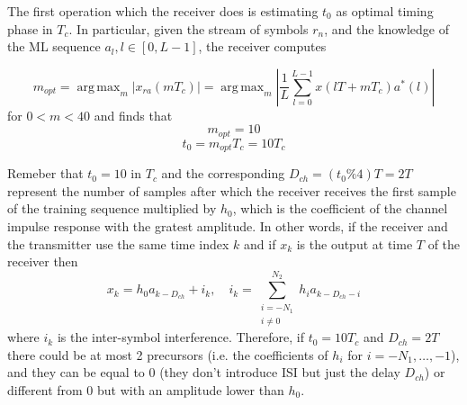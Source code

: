 \documentclass[10pt]{article}
\DeclareMathOperator*{\argmax}{arg\,max}
\begin{document}
The first operation which the receiver does is estimating $t_0$ as optimal timing phase in $T_c$. In particular, given the stream of symbols $r_n$, and the knowledge of the ML sequence $a_l, l\in [0, L-1]$, the receiver computes

\begin{equation}
	m_{opt} = \argmax_m | x_{ra}(mT_c) | = \argmax_{m} | \frac{1}{L} \sum_{l = 0}^{L - 1} x(lT + mT_c)a^* (l) |
\end{equation}
for $ 0 < m < 40$ and finds that
\begin{equation}
	m_{opt} = 10
\end{equation}
\begin{equation}
	t_{0} = m_{opt}T_c = 10 T_c
\end{equation}

Remeber that $t_0 = 10$ in $T_c$ and the corresponding $D_{ch} = (t_0 \% 4)T = 2T$ represent the number of samples after which the receiver receives the first sample of the training sequence multiplied by $h_0$, which is the coefficient of the channel impulse response with the gratest amplitude. In other words, if the receiver and the transmitter use the same time index $k$ and if $x_k$ is the output at time $T$ of the receiver then
\begin{equation}
x_{k} = h_0a_{k-D_{ch}} + i_k, \quad i_k = \sum_{\substack{i = -N_1 \\ i \neq 0}}^{N_2} h_i a_{k-D_{ch}-i}
\end{equation}
where $i_k$ is the inter-symbol interference. Therefore, if $t_0 = 10T_c$ and $D_{ch} = 2T$ there could be at most 2 precursors (i.e. the coefficients of $h_i$ for $i = -N_1, \dots, -1$), and they can be equal to 0 (they don't introduce ISI but just the delay $D_{ch}$) or different from 0 but with an amplitude lower than $h_0$. 
\end{document}

